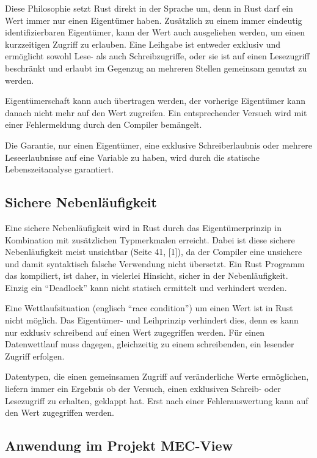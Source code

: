 \begin{multicols}{2}
Diese Philosophie setzt Rust direkt in der Sprache um, denn in Rust darf ein Wert immer nur einen Eigentümer haben.
Zusätzlich zu einem immer eindeutig identifizierbaren Eigentümer, kann der Wert auch ausgeliehen werden, um einen kurzzeitigen Zugriff zu erlauben.
Eine Leihgabe ist entweder exklusiv und ermöglicht sowohl Lese- als auch Schreibzugriffe, oder sie ist auf einen Lesezugriff beschränkt und erlaubt im Gegenzug an mehreren Stellen gemeinsam genutzt zu werden.

Eigentümerschaft kann auch übertragen werden, der vorherige Eigentümer kann danach nicht mehr auf den Wert zugreifen.
Ein entsprechender Versuch wird mit einer Fehlermeldung durch den Compiler bemängelt.

Die Garantie, nur einen Eigentümer, eine exklusive Schreiberlaubnis oder mehrere Leseerlaubnisse auf eine Variable zu haben, wird durch die statische Lebenszeitanalyse garantiert.

\subsection*{Sichere Nebenläufigkeit}

Eine sichere Nebenläufigkeit wird in Rust durch das Eigentümerprinzip in Kombination mit zusätzlichen Typmerkmalen erreicht.
Dabei ist diese sichere Nebenläufigkeit meist unsichtbar (Seite 41, [1]), da der Compiler eine unsichere und damit syntaktisch falsche Verwendung nicht übersetzt.
Ein Rust Programm das kompiliert, ist daher, in vielerlei Hinsicht, sicher in der Nebenläufigkeit.
Einzig ein \enquote{Deadlock} kann nicht statisch ermittelt und verhindert werden.

Eine Wettlaufsituation (englisch \enquote{race condition}) um einen Wert ist in Rust nicht möglich.
Das Eigentümer- und Leihprinzip verhindert dies, denn es kann nur exklusiv schreibend auf einen Wert zugegriffen werden.
Für einen Datenwettlauf muss dagegen, gleichzeitig zu einem schreibenden, ein lesender Zugriff erfolgen.

Datentypen, die einen gemeinsamen Zugriff auf veränderliche Werte ermöglichen, liefern immer ein Ergebnis ob der Versuch, einen exklusiven Schreib- oder Lesezugriff zu erhalten, geklappt hat.
Erst nach einer Fehlerauswertung kann auf den Wert zugegriffen werden.

\subsection*{Anwendung im Projekt MEC-View}


\end{multicols}
